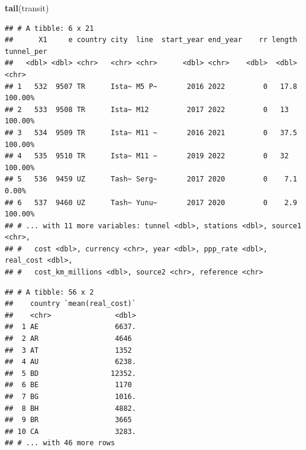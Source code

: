\documentclass[]{article}
\newenvironment{Shaded}{\begin{snugshade}}{\end{snugshade}}
\newcommand{\CommentTok}[1]{\textcolor[rgb]{0.56,0.35,0.01}{\textit{#1}}}
\newcommand{\KeywordTok}[1]{\textcolor[rgb]{0.13,0.29,0.53}{\textbf{#1}}}
\newcommand{\NormalTok}[1]{#1}
\newcommand{\OperatorTok}[1]{\textcolor[rgb]{0.81,0.36,0.00}{\textbf{#1}}}
\newcommand{\StringTok}[1]{\textcolor[rgb]{0.31,0.60,0.02}{#1}}
\begin{document}
\begin{Shaded}
\begin{Highlighting}[]
\KeywordTok{tail}\NormalTok{(transit)}
\end{Highlighting}
\end{Shaded}

\begin{verbatim}
## # A tibble: 6 x 21
##      X1     e country city  line  start_year end_year    rr length tunnel_per
##   <dbl> <dbl> <chr>   <chr> <chr>      <dbl> <chr>    <dbl>  <dbl> <chr>     
## 1   532  9507 TR      Ista~ M5 P~       2016 2022         0   17.8 100.00%   
## 2   533  9508 TR      Ista~ M12         2017 2022         0   13   100.00%   
## 3   534  9509 TR      Ista~ M11 ~       2016 2021         0   37.5 100.00%   
## 4   535  9510 TR      Ista~ M11 ~       2019 2022         0   32   100.00%   
## 5   536  9459 UZ      Tash~ Serg~       2017 2020         0    7.1 0.00%     
## 6   537  9460 UZ      Tash~ Yunu~       2017 2020         0    2.9 100.00%   
## # ... with 11 more variables: tunnel <dbl>, stations <dbl>, source1 <chr>,
## #   cost <dbl>, currency <chr>, year <dbl>, ppp_rate <dbl>, real_cost <dbl>,
## #   cost_km_millions <dbl>, source2 <chr>, reference <chr>
\end{verbatim}

\begin{Shaded}
\end{Shaded}

\begin{verbatim}
## # A tibble: 56 x 2
##    country `mean(real_cost)`
##    <chr>               <dbl>
##  1 AE                  6637.
##  2 AR                  4646 
##  3 AT                  1352 
##  4 AU                  6238.
##  5 BD                 12352.
##  6 BE                  1170 
##  7 BG                  1016.
##  8 BH                  4882.
##  9 BR                  3665 
## 10 CA                  3283.
## # ... with 46 more rows
\end{verbatim}

\begin{Shaded}
\end{Shaded}
\end{document}
